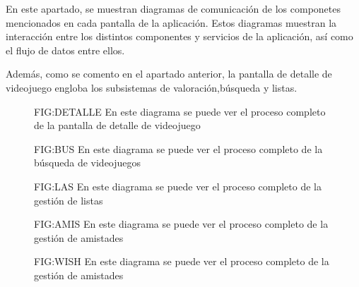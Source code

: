 En este apartado, se muestran diagramas de comunicación de los componetes mencionados en cada pantalla de la aplicación.
Estos diagramas muestran la interacción entre los distintos componentes y servicios de la aplicación, así como el flujo de datos entre ellos.

Además, como se comento en el apartado anterior, la pantalla de detalle de videojuego engloba los subsistemas de valoración,búsqueda y listas. 

\begin{figure}[Componentes implicados para la pantalla de detalle de videojuego]{FIG:DETALLE}{ En este diagrama se puede ver el proceso completo de la pantalla de detalle de videojuego}
\end{figure}

\begin{figure}[Componentes implicados para la pantalla de inicio]{FIG:BUS}{ En este diagrama se puede ver el proceso completo de la búsqueda de videojuegos}
\end{figure}

\begin{figure}[Componentes implicados para la sección 'Mis listas']{FIG:LAS}{ En este diagrama se puede ver el proceso completo de la gestión de listas}
\end{figure}

\begin{figure}[Componentes implicados para la sección 'Amistades']{FIG:AMIS}{ En este diagrama se puede ver el proceso completo de la gestión de amistades}
\end{figure}

\begin{figure}[Componentes implicados para la sección 'Amistades']{FIG:WISH}{ En este diagrama se puede ver el proceso completo de la gestión de amistades}
\end{figure}